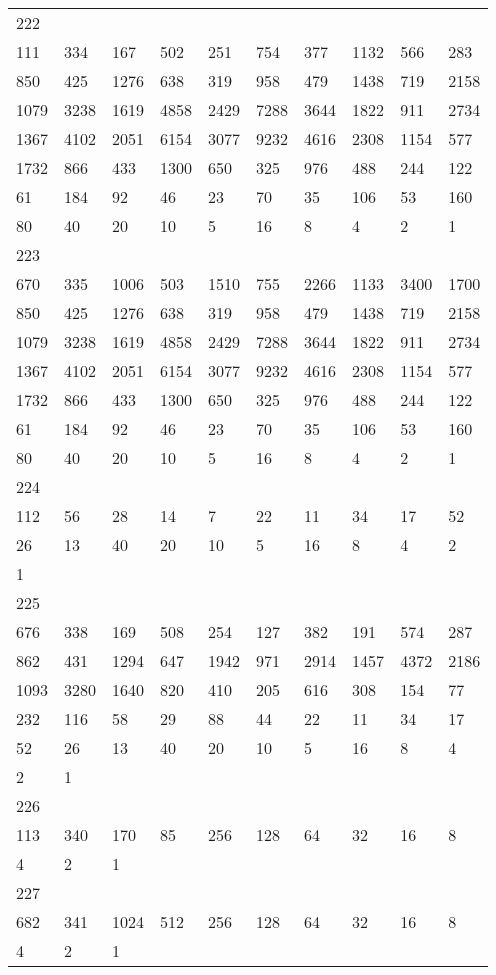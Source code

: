 \begin{longtable}{*{10}{l}}
222&&&&&&&&&\\
111& 334& 167& 502& 251& 754& 377& 1132& 566& 283\\
850& 425& 1276& 638& 319& 958& 479& 1438& 719& 2158\\
1079& 3238& 1619& 4858& 2429& 7288& 3644& 1822& 911& 2734\\
1367& 4102& 2051& 6154& 3077& 9232& 4616& 2308& 1154& 577\\
1732& 866& 433& 1300& 650& 325& 976& 488& 244& 122\\
61& 184& 92& 46& 23& 70& 35& 106& 53& 160\\
80& 40& 20& 10& 5& 16& 8& 4& 2& 1\\

223&&&&&&&&&\\
670& 335& 1006& 503& 1510& 755& 2266& 1133& 3400& 1700\\
850& 425& 1276& 638& 319& 958& 479& 1438& 719& 2158\\
1079& 3238& 1619& 4858& 2429& 7288& 3644& 1822& 911& 2734\\
1367& 4102& 2051& 6154& 3077& 9232& 4616& 2308& 1154& 577\\
1732& 866& 433& 1300& 650& 325& 976& 488& 244& 122\\
61& 184& 92& 46& 23& 70& 35& 106& 53& 160\\
80& 40& 20& 10& 5& 16& 8& 4& 2& 1\\

224&&&&&&&&&\\
112& 56& 28& 14& 7& 22& 11& 34& 17& 52\\
26& 13& 40& 20& 10& 5& 16& 8& 4& 2\\
1& \\

225&&&&&&&&&\\
676& 338& 169& 508& 254& 127& 382& 191& 574& 287\\
862& 431& 1294& 647& 1942& 971& 2914& 1457& 4372& 2186\\
1093& 3280& 1640& 820& 410& 205& 616& 308& 154& 77\\
232& 116& 58& 29& 88& 44& 22& 11& 34& 17\\
52& 26& 13& 40& 20& 10& 5& 16& 8& 4\\
2& 1& \\

226&&&&&&&&&\\
113& 340& 170& 85& 256& 128& 64& 32& 16& 8\\
4& 2& 1& \\

227&&&&&&&&&\\
682& 341& 1024& 512& 256& 128& 64& 32& 16& 8\\
4& 2& 1& \\


\end{longtable}
